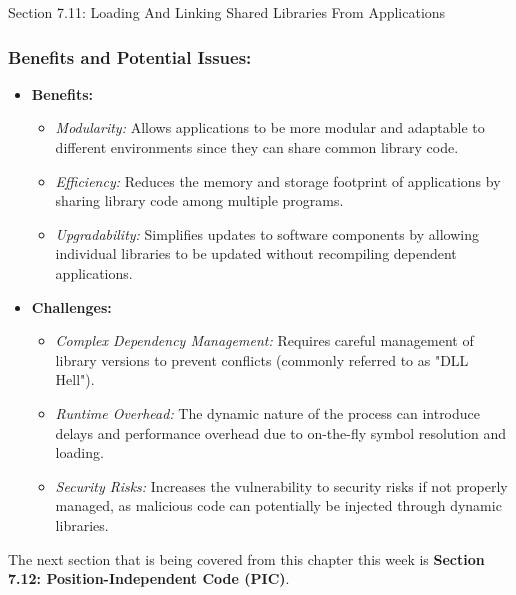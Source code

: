\begin{notes}{Section 7.11: Loading And Linking Shared Libraries From Applications}
    \subsubsection*{Benefits and Potential Issues:}
    
    \begin{itemize}
        \item \textbf{Benefits:}
            \begin{itemize}
                \item \emph{Modularity:} Allows applications to be more modular and adaptable to different environments since they can share common library code.
                \item \emph{Efficiency:} Reduces the memory and storage footprint of applications by sharing library code among multiple programs.
                \item \emph{Upgradability:} Simplifies updates to software components by allowing individual libraries to be updated without recompiling dependent applications.
            \end{itemize}
        \item \textbf{Challenges:}
            \begin{itemize}
                \item \emph{Complex Dependency Management:} Requires careful management of library versions to prevent conflicts (commonly referred to as "DLL Hell").
                \item \emph{Runtime Overhead:} The dynamic nature of the process can introduce delays and performance overhead due to on-the-fly symbol resolution and loading.
                \item \emph{Security Risks:} Increases the vulnerability to security risks if not properly managed, as malicious code can potentially be injected through dynamic libraries.
            \end{itemize}
    \end{itemize}    
\end{notes}

The next section that is being covered from this chapter this week is \textbf{Section 7.12: Position-Independent Code (PIC)}.

